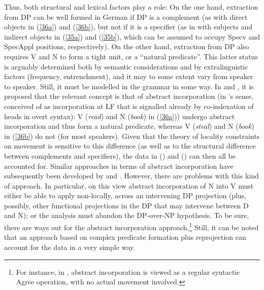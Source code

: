 \documentclass[output=paper
,modfonts
,nonflat]{langsci/langscibook}
\begin{document}
	\ea\label{ex:mueller:38}
	\z
	\z
	Thus, both structural and lexical factors play a role: On the one
	hand, extraction from DP can be well formed in German if DP is a complement
	(as with direct objects in (\ref{36a}) and (\ref{36b}), but not if it is a specifier (as in
	with subjects and indirect objects in (\ref{35a}) and (\ref{35b}), which can be assumed
	to occupy Specv and SpecAppl positions, respectively). On the other
	hand, extraction from DP also requires V and N to form a tight unit,
	or a ``natural predicate''. This latter status is arguably determined
	both by semantic considerations and by extralinguistic factors
	(frequency, entrenchment), and it may to some extent vary from speaker
	to speaker. Still, it must be modelled in the grammar in some way. In
	\citet{Mueller:91:abs} and \citet{MuellerSternefeld:95}, it is proposed
	that the relevant concept is that of abstract incorporation (in
	\citealt{Baker:88}'s sense, conceived of as incorporation at LF that
	is signalled already by co-indexation of heads in overt syntax): V
	(\textit{read}) and N (\textit{book}) in (\ref{36a})) undergo abstract
	incorporation and thus form a natural predicate, whereas V (\textit{steal}) 
	and N (\textit{book}) in (\ref{36b}) do not (for most speakers). Given that
	the theory of locality constraints on movement is sensitive to this
	difference (as well as to the structural difference between
	complements and specifiers), the data in (\LLast) and (\Last) can then all
	be accounted for. Similar approaches in terms of abstract
	incorporation have subsequently been developed by
	\citet{DaviesDubinsky:03} and \citet{Schmellentin:06}. However, there
	are problems with this kind of approach. In particular, on this view
	abstract incorporation of N into V must either be able to apply
	non-locally, across an intervening DP projection (plus, possibly,
	other functional projections in the DP that may intervene between D
	and N); or the analysis must abandon the DP-over-NP hypothesis. To be
	sure, there are ways out for the abstract incorporation
	approach.\footnote{For instance, in \citet{Mueller:11:loc}, abstract incorporation is
		viewed as a regular syntactic Agree operation, with no actual
		movement involved.} Still, it can be noted that an approach based on
	complex predicate formation plus reprojection can account for the data
	in a very simple way. 
	
\end{document}
